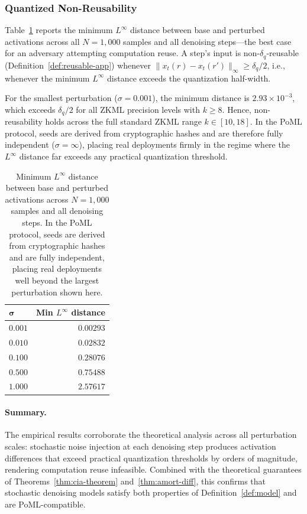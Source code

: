 \subsubsection{Quantized Non-Reusability}

Table~\ref{tab:min-linf-app} reports the minimum $L^\infty$ distance between base and perturbed activations across all $N = 1{,}000$ samples and all denoising steps---the best case for an adversary attempting computation reuse. A step's input is non-$\delta_q$-reusable (Definition~\ref{def:reusable-app}) whenever $\|x_t(r) - x_t(r')\|_\infty \geq \delta_q / 2$, i.e., whenever the minimum $L^\infty$ distance exceeds the quantization half-width.

For the smallest perturbation ($\sigma = 0.001$), the minimum distance is $2.93 \times 10^{-3}$, which exceeds $\delta_q/2$ for all ZKML precision levels with $k \geq 8$. Hence, non-reusability holds across the full standard ZKML range $k \in [10, 18]$. In the PoML protocol, seeds are derived from cryptographic hashes and are therefore fully independent ($\sigma = \infty$), placing real deployments firmly in the regime where the $L^\infty$ distance far exceeds any practical quantization threshold.

\begin{table}[t]
  \centering
  \caption{Minimum $L^\infty$ distance between base and perturbed activations across $N = 1{,}000$ samples and all denoising steps. In the PoML protocol, seeds are derived from cryptographic hashes and are fully independent, placing real deployments well beyond the largest perturbation shown here.}
  \label{tab:min-linf-app}
  \begin{tabular}{lr}
    \toprule
    $\boldsymbol{\sigma}$ & \textbf{Min $L^\infty$ distance} \\
    \midrule
    $0.001$ & $0.00293$ \\
    $0.010$ & $0.02832$ \\
    $0.100$ & $0.28076$ \\
    $0.500$ & $0.75488$ \\
    $1.000$ & $2.57617$ \\
    \bottomrule
  \end{tabular}
\end{table}

\paragraph{Summary.}
The empirical results corroborate the theoretical analysis across all perturbation scales: stochastic noise injection at each denoising step produces activation differences that exceed practical quantization thresholds by orders of magnitude, rendering computation reuse infeasible. Combined with the theoretical guarantees of Theorems~\ref{thm:cia-theorem} and~\ref{thm:amort-diff}, this confirms that stochastic denoising models satisfy both properties of Definition~\ref{def:model} and are PoML-compatible.


